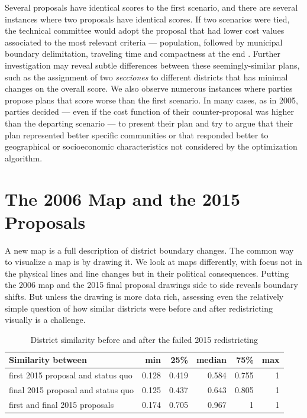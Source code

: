 \documentclass[letter,12pt]{article}
\begin{document}
Several proposals have identical scores to the first scenario, and there are several instances where two proposals have identical scores. If two scenarios were tied, the technical committee would adopt the proposal that had lower cost values associated to the most relevant criteria --- population, followed by municipal boundary delimitation, traveling time and compactness at the end \citep{acuerdoife2013}. Further investigation may reveal subtle differences between these seemingly-similar plans, such as the assignment of two \emph{secciones} to different districts that has minimal changes on the overall score. We also observe numerous instances where parties propose plans that score worse than the first scenario. In many cases, as in 2005, parties decided --- even if the cost function of their counter-proposal was higher than the departing scenario --- to present their plan and try to argue that their plan represented better specific communities or that responded better to geographical or socioeconomic characteristics not considered by the optimization algorithm.

\section{The 2006 Map and the 2015 Proposals}

A new map is a full description of district boundary changes. The common way to visualize a map is by drawing it. We look at maps differently, with focus not in the physical lines and line changes but in their political consequences. Putting the 2006 map and the 2015 final proposal drawings side to side reveals boundary shifts. But unless the drawing is more data rich, assessing even the relatively simple question of how similar districts were before and after redistricting visually is a challenge. 

\begin{table}
\begin{center}
  \begin{tabular}{lrrrrr}
  Similarity between                 &   min  &  25\%  & median &  75\% &  max \\ \hline
  first 2015 proposal and status quo & 0.128  & 0.419  & 0.584  & 0.755 &  1   \\
  final 2015 proposal and status quo & 0.125  & 0.437  & 0.643  & 0.805 &  1   \\
  first and final 2015 proposals     & 0.174  & 0.705  & 0.967  & 1     &  1   \\
  \end{tabular}
  \caption{District similarity before and after the failed 2015 redistricting}\label{T:simIndex}
\end{center}
\end{table}
\end{document}
